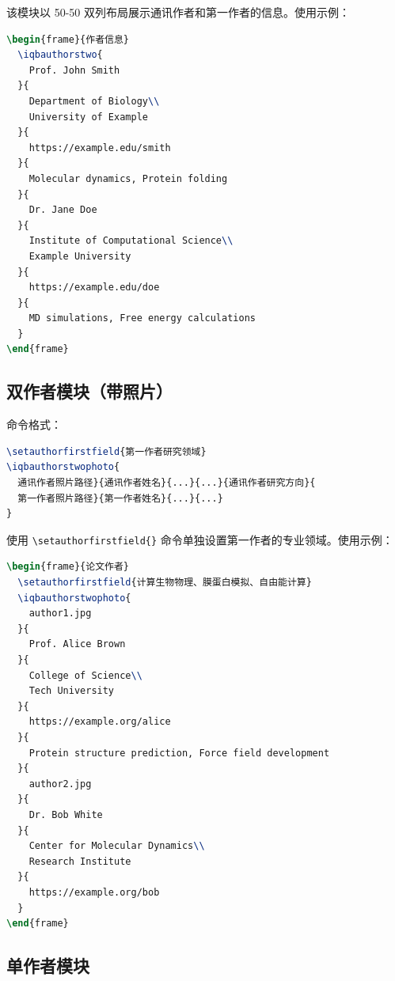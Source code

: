 该模块以 50-50 双列布局展示通讯作者和第一作者的信息。使用示例：

\begin{lstlisting}[style=blockstyle,language=TeX]
\begin{frame}{作者信息}
  \iqbauthorstwo{
    Prof. John Smith
  }{
    Department of Biology\\
    University of Example
  }{
    https://example.edu/smith
  }{
    Molecular dynamics, Protein folding
  }{
    Dr. Jane Doe
  }{
    Institute of Computational Science\\
    Example University
  }{
    https://example.edu/doe
  }{
    MD simulations, Free energy calculations
  }
\end{frame}
\end{lstlisting}

\subsection{双作者模块（带照片）}

命令格式：

\begin{lstlisting}[style=blockstyle,language=TeX]
\setauthorfirstfield{第一作者研究领域}
\iqbauthorstwophoto{
  通讯作者照片路径}{通讯作者姓名}{...}{...}{通讯作者研究方向}{
  第一作者照片路径}{第一作者姓名}{...}{...}
}
\end{lstlisting}

使用 \lstinline|\setauthorfirstfield{}| 命令单独设置第一作者的专业领域。使用示例：

\begin{lstlisting}[style=blockstyle,language=TeX]
\begin{frame}{论文作者}
  \setauthorfirstfield{计算生物物理、膜蛋白模拟、自由能计算}
  \iqbauthorstwophoto{
    author1.jpg
  }{
    Prof. Alice Brown
  }{
    College of Science\\
    Tech University
  }{
    https://example.org/alice
  }{
    Protein structure prediction, Force field development
  }{
    author2.jpg
  }{
    Dr. Bob White
  }{
    Center for Molecular Dynamics\\
    Research Institute
  }{
    https://example.org/bob
  }
\end{frame}
\end{lstlisting}

\subsection{单作者模块}

